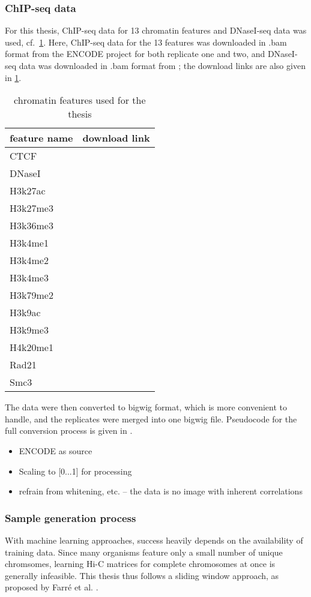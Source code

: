 \subsubsection{ChIP-seq data} \label{sec:methods:chipseq}
For this thesis, ChIP-seq data for 13 chromatin features and DNaseI-seq data was used, cf.~\cref{tab:methods:csdata}.
Here, ChIP-seq data for the 13 features was downloaded in .bam format from the ENCODE project \xxx for both replicate one and two,
and DNaseI-seq data was downloaded in .bam format from \xxx; the download links are also given in \cref{tab:methods:csdata}.
\begin{table}[ht!]
\centering
 \begin{tabular}{ll}
 \hline
  feature name & download link \\  \hline
  CTCF & \\
  DNaseI &\\
  H3k27ac & \\
  H3k27me3 &\\
  H3k36me3 &\\
  H3k4me1 &\\
  H3k4me2 &\\
  H3k4me3 &\\
  H3k79me2 &\\
  H3k9ac &\\
  H3k9me3 &\\
  H4k20me1 &\\
  Rad21 &\\
  Smc3 & \\ \hline
 \end{tabular}
 \caption{chromatin features used for the thesis} \label{tab:methods:csdata}
\end{table}

The data were then converted to bigwig format, which is more convenient to handle, and the replicates were merged into 
one bigwig file. Pseudocode for the full conversion process is given in \xxx.

\begin{itemize}
 \item ENCODE as source
 \item Scaling to [0...1] for processing
 \item refrain from whitening, etc. -- the data is no image with inherent correlations
\end{itemize}

\subsubsection{Sample generation process} \label{sec:methods:sample_gen}
With machine learning approaches, success heavily depends on the availability of training data.
Since many organisms feature only a small number of unique chromsomes, learning Hi-C matrices 
for complete chromosomes at once is generally infeasible.
This thesis thus follows a sliding window approach, as proposed by Farr\'e et al. \cite{Farre2018a}.

